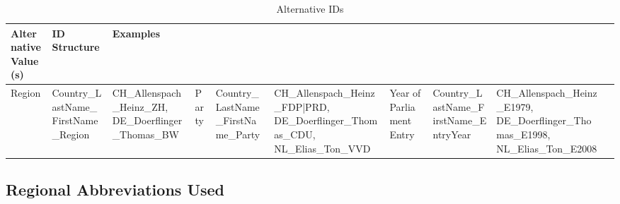 \documentclass{article}
\begin{document}

    \begin{longtable}
        {|m{}|
          m{}|
          m{}|}
\caption{Alternative IDs} %
 \\\hline
 Alternative Value(s) & ID Structure & Examples \\ \hline

        Region &
        Country\_LastName\_FirstName\_Region &
        CH\_Allenspach\_Heinz\_ZH, DE\_Doerflinger\_Thomas\_BW &
    \hline
    
        Party &
        Country\_LastName\_FirstName\_Party &
        CH\_Allenspach\_Heinz\_FDP|PRD, DE\_Doerflinger\_Thomas\_CDU, \newline NL\_Elias\_Ton\_VVD &
    \hline
    
    
        Year of Parliament Entry &
        Country\_LastName\_FirstName\_EntryYear &
        CH\_Allenspach\_Heinz\_E1979, DE\_Doerflinger\_Thomas\_E1998, \newline NL\_Elias\_Ton\_E2008 &
    \hline
 \end{longtable} 



\subsection{Regional Abbreviations Used}\label{AltIDS}
\end{document}
